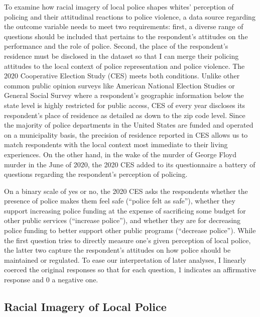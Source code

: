 \documentclass[
  12pt,
]{article}
\begin{document}
To examine how racial imagery of local police shapes whites' perception
of policing and their attitudinal reactions to police violence, a data
source regarding the outcome variable needs to meet two requirements:
first, a diverse range of questions should be included that pertains to
the respondent's attitudes on the performance and the role of police.
Second, the place of the respondent's residence must be disclosed in the
dataset so that I can merge their policing attitudes to the local
context of police representation and police violence. The 2020
Cooperative Election Study (CES) meets both conditions. Unlike other
common public opinion surveys like American National Election Studies or
General Social Survey where a respondent's geographic information below
the state level is highly restricted for public access, CES of every
year discloses its respondent's place of residence as detailed as down
to the zip code level. Since the majority of police departments in the
United States are funded and operated on a municipality basis, the
precision of residence reported in CES allows us to match respondents
with the local context most immediate to their living experiences. On
the other hand, in the wake of the murder of George Floyd murder in the
June of 2020, the 2020 CES added to its questionnaire a battery of
questions regarding the respondent's perception of policing.

On a binary scale of yes or no, the 2020 CES asks the respondents
whether the presence of police makes them feel safe (``police felt as
safe''), whether they support increasing police funding at the expense
of sacrificing some budget for other public services (``increase
police''), and whether they are for decreasing police funding to better
support other public programs (``decrease police''). While the first
question tries to directly measure one's given perception of local
police, the latter two capture the respondent's attitudes on how police
should be maintained or regulated. To ease our interpretation of later
analyses, I linearly coerced the original responses so that for each
question, 1 indicates an affirmative response and 0 a negative one.

\hypertarget{racial-imagery-of-local-police}{%
\subsection{Racial Imagery of Local
Police}\label{racial-imagery-of-local-police}}
\end{document}
